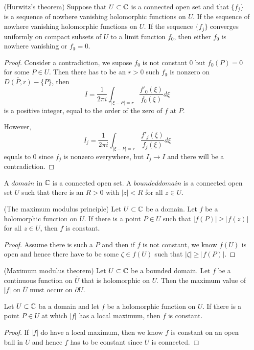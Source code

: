 \begin{theorem}
    (Hurwitz's theorem) Suppose that $U\subset\mathbb{C}$ is a connected open set and that $\{f_j\}$ is a sequence of nowhere vanishing holomorphic functions on $U$. If the sequence of nowhere vanishing holomorphic functions on $U$. If the sequence $\{f_j\}$ converges uniformly on compact subsets of $U$ to a limit function $f_0$, then either $f_0$ is nowhere vanishing or $f_0 = 0$.
\end{theorem}
\begin{proof}
    Consider a contradiction, we supose $f_0$ is not constant $0$ but $f_0(P) = 0$ for some $P\in U$. Then there has to be an $r>0$ such $f_0$ is nonzero on $\overline{D(P,r)} - \{P\}$, then
    \[I = \dfrac{1}{2\pi i} \int_{|\xi-P| = r} \dfrac{f'_0(\xi)}{f_0(\xi)} d\xi\]
    is a positive integer, equal to the order of the zero of $f$ at $P$.\par
    However,
    \[I_j = \dfrac{1}{2\pi i} \int_{|\xi-P| = r} \dfrac{f'_j(\xi)}{f_j(\xi)} d\xi\]
    equals to $0$ since $f_j$ is nonzero everywhere, but $I_j \to I$ and there will be a contradiction.
\end{proof}

\begin{definition}
    A $domain$ in $\mathbb{C}$ is a connected open set. A $bounded domain$ is a connected open set $U$ such that there is an $R>0$ with $|z|<R$ for all $z\in U$. 
\end{definition}

\begin{theorem}
    (The maximum modulus principle) Let $U\subset\mathbb{C}$ be a domain. Let $f$ be a holomorphic function on $U$. If there is a point $P\in U$ such that $|f(P)| \geq |f(z)|$ for all $z\in U$, then $f$ is constant.
\end{theorem}
\begin{proof}
    Assume there is such a $P$ and then if $f$ is not constant, we know $f(U)$ is open and hence there have to be some $ \zeta \in f(U)$ such that $|\zeta| \geq |f(P)|$.
\end{proof}

\begin{corollary}
    (Maximum modulus theorem) Let $U\subset\mathbb{C}$ be a bounded domain. Let $f$ be a continuous function on $\overline{U}$ that is holomorphic on $U$. Then the maximum value of $|f|$ on $\overline{U}$ must occur on $\partial U$.
\end{corollary}

\begin{theorem}
    Let $U\subset\mathbb{C}$ ba a domain and let $f$ be a holomorphic function on $U$. If there is a point $P\in U$ at which $|f|$ has a local maximum, then $f$ is constant.
\end{theorem}
\begin{proof}
    If $|f|$ do have a local maximum, then we know $f$ is constant on an open ball in $U$ and hence $f$ has to be constant since $U$ is connected.
\end{proof}


